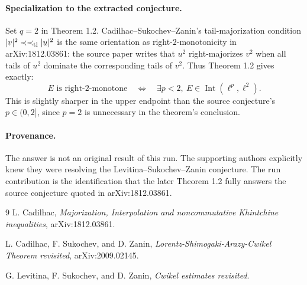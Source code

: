 \documentclass[11pt]{article}
\newcommand{\Int}{\operatorname{Int}}
\begin{document}
\paragraph{Specialization to the extracted conjecture.}
Set \(q=2\) in Theorem 1.2.  Cadilhac--Sukochev--Zanin's tail-majorization
condition \(|v|^2\prec\prec_{\rm tl}|u|^2\) is the same orientation as
right-\(2\)-monotonicity in arXiv:1812.03861: the source paper writes that
\(u^2\) right-majorizes \(v^2\) when all tails of \(u^2\) dominate the
corresponding tails of \(v^2\).  Thus Theorem 1.2 gives exactly:
\[
  E \text{ is right-}2\text{-monotone}
  \quad\Longleftrightarrow\quad
  \exists p<2,\ E\in \Int(\ell^p,\ell^2).
\]
This is slightly sharper in the upper endpoint than the source conjecture's
\(p\in(0,2]\), since \(p=2\) is unnecessary in the theorem's conclusion.

\paragraph{Provenance.}
The answer is not an original result of this run.  The supporting authors
explicitly knew they were resolving the Levitina--Sukochev--Zanin
conjecture.  The run contribution is the identification that the later
Theorem 1.2 fully answers the source conjecture quoted in arXiv:1812.03861.

\begin{thebibliography}{9}
L. Cadilhac,
\emph{Majorization, Interpolation and noncommutative Khintchine inequalities},
arXiv:1812.03861.

L. Cadilhac, F. Sukochev, and D. Zanin,
\emph{Lorentz-Shimogaki-Arazy-Cwikel Theorem revisited},
arXiv:2009.02145.

G. Levitina, F. Sukochev, and D. Zanin,
\emph{Cwikel estimates revisited}.
\end{thebibliography}
\end{document}

